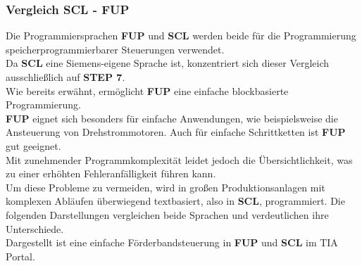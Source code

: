 \subsubsection*{Vergleich SCL - FUP}
Die Programmiersprachen \textbf{FUP} und \textbf{SCL} werden beide für die Programmierung speicherprogrammierbarer Steuerungen verwendet.\\
Da \textbf{SCL} eine Siemens-eigene Sprache ist, konzentriert sich dieser Vergleich ausschließlich auf \textbf{STEP 7}.\\
Wie bereits erwähnt, ermöglicht \textbf{FUP} eine einfache blockbasierte Programmierung.\\
\textbf{FUP} eignet sich besonders für einfache Anwendungen, wie beispielsweise die Ansteuerung von Drehstrommotoren. Auch für einfache Schrittketten ist \textbf{FUP} gut geeignet.\\
Mit zunehmender Programmkomplexität leidet jedoch die Übersichtlichkeit, was zu einer erhöhten Fehleranfälligkeit führen kann.\\
Um diese Probleme zu vermeiden, wird in großen Produktionsanlagen mit komplexen Abläufen überwiegend textbasiert, also in \textbf{SCL}, programmiert.
\newpage
Die folgenden Darstellungen vergleichen beide Sprachen und verdeutlichen ihre Unterschiede.\\
Dargestellt ist eine einfache Förderbandsteuerung in \textbf{FUP} und \textbf{SCL} im TIA Portal.
